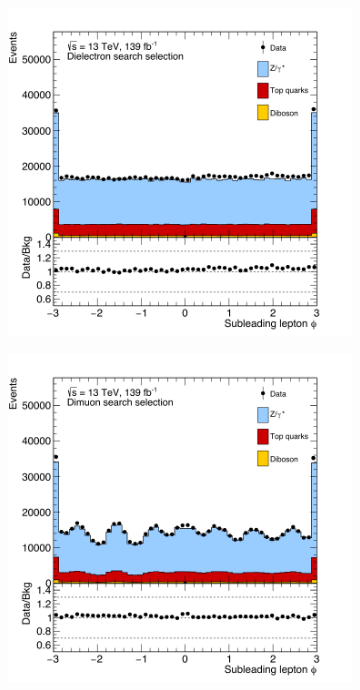 \begin{figure}[]
    \centering
    \begin{subfigure}[b]{0.49\textwidth}
        \centering
        \includegraphics[width=\textwidth]{figures/analysis/datamc/dataMCcompare/ee_phi2.png}
        \label{fig:datamc:eephi2}
    \end{subfigure}
    \begin{subfigure}[b]{0.49\textwidth}
        \centering
        \includegraphics[width=\textwidth]{figures/analysis/datamc/dataMCcompare/uu_phi2.png}

\end{subfigure}
\end{figure}
